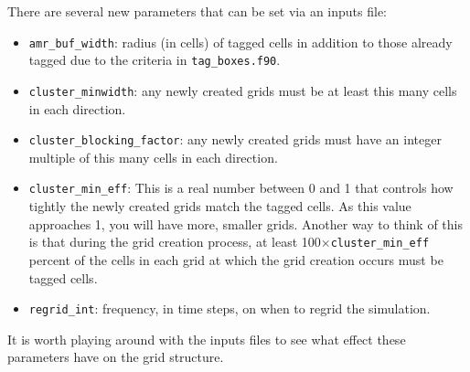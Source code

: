 There are several new
parameters that can be set via an inputs file:
\begin{itemize}
\item {\tt amr\_buf\_width}: radius (in cells) of tagged cells in addition to those already tagged due to the criteria in {\tt tag\_boxes.f90}.
\item {\tt cluster\_minwidth}: any newly created grids must be at least this many cells in each direction.
\item {\tt cluster\_blocking\_factor}: any newly created grids must have an integer multiple of this many cells in each direction.
\item {\tt cluster\_min\_eff}: This is a real number between 0 and 1 that controls how tightly the newly created grids match the tagged cells.  As this value approaches 1, you will have more, smaller grids.  Another way to think of this is that during the grid creation process, at least 100$\times${\tt cluster\_min\_eff} percent of the cells in each grid at which the grid creation occurs must be tagged cells.
\item {\tt regrid\_int}: frequency, in time steps, on when to regrid the simulation.
\end{itemize}
It is worth playing around with the inputs files to see what effect these parameters have on the grid structure.

